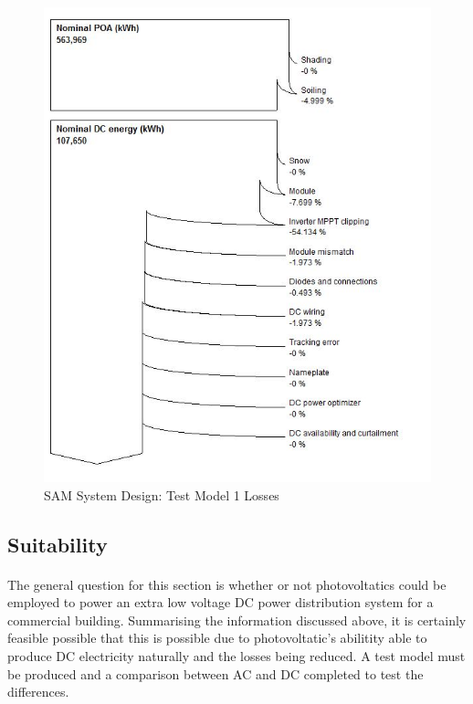 \begin{figure}[H]
\hfill\includegraphics[width = 120mm]{images/sam-1-system-losses}\hspace*{\fill}
\caption{SAM System Design: Test Model 1 Losses} 
\label{fig:SAM-Model-2}
\end{figure}


\subsection{Suitability}

\paragraph{}
The general question for this section is whether or not photovoltatics could be employed to power an extra low voltage DC power distribution system for a commercial building. Summarising the information discussed above, it is certainly feasible possible that this is possible due to photovoltatic's abilitity able to produce DC electricity naturally and the losses being reduced. A test model must be produced and a comparison between AC and DC completed to test the differences.  
